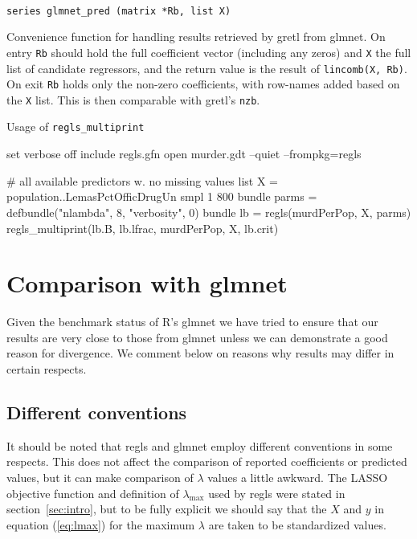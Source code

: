 \documentclass{article}
\newcommand{\startappendices}{%
\newcounter{appcount}
\setcounter{appcount}{0}
\renewcommand{\thesection}{Appendix \Alph{appcount}}}
\newcommand{\myappendix}[1]{%
\addtocounter{appcount}{1}
\section{#1}}
\newenvironment{funcdoc}
{\noindent\hrulefill\\[-12pt]}
{\medbreak}
\begin{document}
\begin{funcdoc}
\begin{verbatim}
series glmnet_pred (matrix *Rb, list X)
\end{verbatim}
  Convenience function for handling results retrieved by gretl from
  \textsf{glmnet}. On entry \texttt{Rb} should hold the full
  coefficient vector (including any zeros) and \texttt{X} the full
  list of candidate regressors, and the return value is the result of
  \texttt{lincomb(X, Rb)}. On exit \texttt{Rb} holds only the non-zero
  coefficients, with row-names added based on the \texttt{X}
  list. This is then comparable with gretl's \texttt{nzb}.
\end{funcdoc}

\begin{script}
  \caption{Usage of \texttt{regls\_multiprint}}
  \label{script:multiprint}
\begin{scode}
set verbose off
include regls.gfn
open murder.gdt --quiet --frompkg=regls

# all available predictors w. no missing values
list X = population..LemasPctOfficDrugUn
smpl 1 800
bundle parms = defbundle("nlambda", 8, "verbosity", 0)
bundle lb = regls(murdPerPop, X, parms)
regls_multiprint(lb.B, lb.lfrac, murdPerPop, X, lb.crit)
\end{scode}
  \end{script}




\clearpage
\startappendices

\myappendix{Comparison with glmnet}
\label{sec:comparison}

Given the benchmark status of \textsf{R}'s \textsf{glmnet} we have
tried to ensure that our results are very close to those from
\textsf{glmnet} unless we can demonstrate a good reason for
divergence. We comment below on reasons why results may differ in
certain respects.

\subsection*{Different conventions}

It should be noted that \textsf{regls} and \textsf{glmnet} employ
different conventions in some respects. This does not affect the
comparison of reported coefficients or predicted values, but it can
make comparison of $\lambda$ values a little awkward. The LASSO
objective function and definition of $\lambda_{\max}$ used by
\textsf{regls} were stated in section~\ref{sec:intro}, but to be fully
explicit we should say that the $X$ and $y$ in equation
(\ref{eq:lmax}) for the maximum $\lambda$ are taken to be standardized
values.
\end{document}
